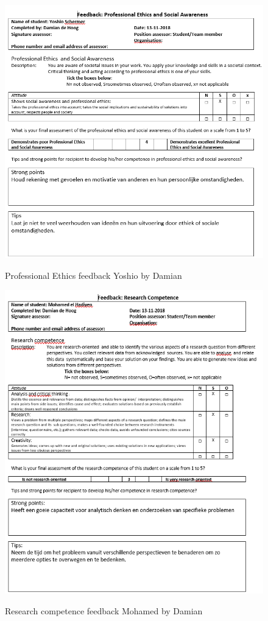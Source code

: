 \documentclass[12pt]{article}
\begin{document}
	\begin{figure}[p!]
		\centering
		\includegraphics[width=\columnwidth]{ProfEthYoshio.PNG}\\
		\caption{Professional Ethics feedback Yoshio by Damian}
	\end{figure}
	\begin{figure}[p!]
		\centering
		\includegraphics[width=\columnwidth]{ResSklMohamed.PNG}\\
		\caption{Research competence feedback Mohamed by Damian}
	\end{figure}
\end{document}
